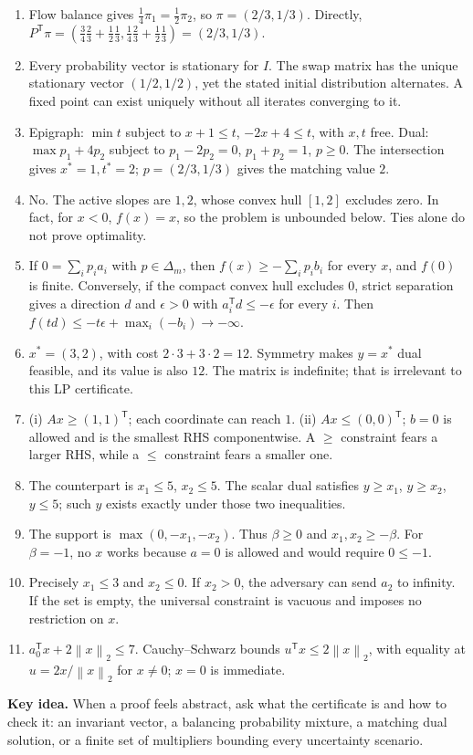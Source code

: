 \documentclass[11pt]{article}
\newenvironment{keyidea}{\begin{shaded}\noindent\textbf{Key idea.} }{\end{shaded}}
\newcommand{\T}{^{\mathsf T}}
\newcommand{\norm}[1]{\left\lVert#1\right\rVert}
\begin{document}
\begin{enumerate}
\item Flow balance gives $\frac14\pi_1=\frac12\pi_2$, so
$\pi=(2/3,1/3)$. Directly,
$P\T\pi=(\frac34\frac23+\frac12\frac13,\frac14\frac23+\frac12\frac13)
=(2/3,1/3)$.
\item Every probability vector is stationary for $I$. The swap matrix
has the unique stationary vector $(1/2,1/2)$, yet the stated initial
distribution alternates. A fixed point can exist uniquely without all
iterates converging to it.
\item Epigraph: $\min t$ subject to $x+1\le t$, $-2x+4\le t$, with
$x,t$ free. Dual: $\max p_1+4p_2$ subject to
$p_1-2p_2=0$, $p_1+p_2=1$, $p\ge0$. The intersection gives
$x^*=1,t^*=2$; $p=(2/3,1/3)$ gives the matching value $2$.
\item No. The active slopes are $1,2$, whose convex hull $[1,2]$
excludes zero. In fact, for $x<0$, $f(x)=x$, so the problem is
unbounded below. Ties alone do not prove optimality.
\item If $0=\sum_i p_i a_i$ with $p\in\Delta_m$, then
$f(x)\ge-\sum_i p_i b_i$ for every $x$, and $f(0)$ is finite.
Conversely, if the compact convex hull excludes $0$, strict separation
gives a direction $d$ and $\epsilon>0$ with $a_i\T d\le-\epsilon$
for every $i$. Then $f(td)\le-t\epsilon+\max_i(-b_i)\to-\infty$.
\item $x^*=(3,2)$, with cost $2\cdot3+3\cdot2=12$.
Symmetry makes $y=x^*$ dual feasible, and its value is also $12$.
The matrix is indefinite; that is irrelevant to this LP certificate.
\item (i) $Ax\ge(1,1)\T$; each coordinate can reach $1$.
(ii) $Ax\le(0,0)\T$; $b=0$ is allowed and is the smallest RHS
componentwise. A $\ge$ constraint fears a larger RHS, while a $\le$
constraint fears a smaller one.
\item The counterpart is $x_1\le5$, $x_2\le5$.
The scalar dual satisfies $y\ge x_1$, $y\ge x_2$, $y\le5$;
such $y$ exists exactly under those two inequalities.
\item The support is $\max(0,-x_1,-x_2)$. Thus
$\beta\ge0$ and $x_1,x_2\ge-\beta$. For $\beta=-1$, no $x$ works
because $a=0$ is allowed and would require $0\le-1$.
\item Precisely $x_1\le3$ and $x_2\le0$. If $x_2>0$, the adversary
can send $a_2$ to infinity. If the set is empty, the universal
constraint is vacuous and imposes no restriction on $x$.
\item $a_0\T x+2\norm{x}_2\le7$. Cauchy--Schwarz bounds
$u\T x\le2\norm{x}_2$, with equality at
$u=2x/\norm{x}_2$ for $x\ne0$; $x=0$ is immediate.
\end{enumerate}
\begin{keyidea}
When a proof feels abstract, ask what the certificate is and how to check
it: an invariant vector, a balancing probability mixture, a matching dual
solution, or a finite set of multipliers bounding every uncertainty scenario.
\end{keyidea}
\end{document}

